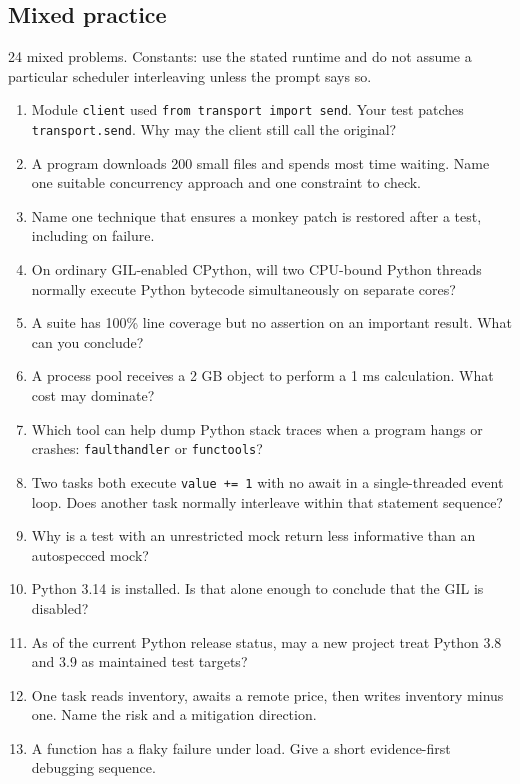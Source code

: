 \documentclass[11pt]{article}
\begin{document}
\clearpage

\begin{keepsection}
\section{Mixed practice}

24 mixed problems. Constants: use the stated runtime and do not assume a particular scheduler interleaving unless the prompt says so.

\begin{enumerate}
\item Module \texttt{client} used \texttt{from transport import send}. Your test patches \texttt{transport.send}. Why may the client still call the original?
\item A program downloads 200 small files and spends most time waiting. Name one suitable concurrency approach and one constraint to check.
\item Name one technique that ensures a monkey patch is restored after a test, including on failure.
\item On ordinary GIL-enabled CPython, will two CPU-bound Python threads normally execute Python bytecode simultaneously on separate cores?
\item A suite has 100\% line coverage but no assertion on an important result. What can you conclude?
\item A process pool receives a 2 GB object to perform a 1 ms calculation. What cost may dominate?
\item Which tool can help dump Python stack traces when a program hangs or crashes: \texttt{faulthandler} or \texttt{functools}?
\item Two tasks both execute \texttt{value += 1} with no await in a single-threaded event loop. Does another task normally interleave within that statement sequence?
\item Why is a test with an unrestricted mock return less informative than an autospecced mock?
\item Python 3.14 is installed. Is that alone enough to conclude that the GIL is disabled?
\item As of the current Python release status, may a new project treat Python 3.8 and 3.9 as maintained test targets?
\item One task reads inventory, awaits a remote price, then writes inventory minus one. Name the risk and a mitigation direction.
\item A function has a flaky failure under load. Give a short evidence-first debugging sequence.

\end{enumerate}
\end{keepsection}
\end{document}
